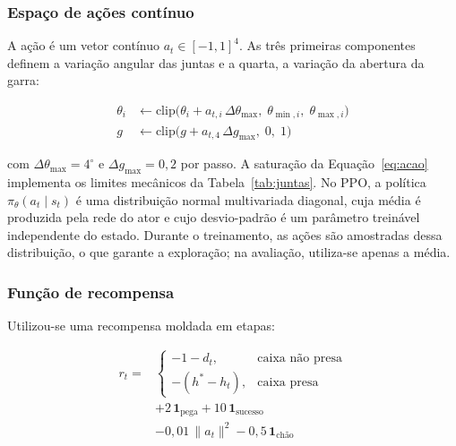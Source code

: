 \documentclass[conference]{IEEEtran}
\begin{document}
\subsubsection{Espaço de ações contínuo}

A ação é um vetor contínuo $a_t \in [-1, 1]^4$. As três primeiras componentes definem a variação angular das juntas e a quarta, a variação da abertura da garra:

\begin{equation}
    \begin{aligned}
        \theta_i &\leftarrow \text{clip}\big(\theta_i + a_{t,i}\,\Delta\theta_{\max},\; \theta_{\min,i},\; \theta_{\max,i}\big) \\
        g &\leftarrow \text{clip}\big(g + a_{t,4}\,\Delta g_{\max},\; 0,\; 1\big)
    \end{aligned}
    \label{eq:acao}
\end{equation}

\noindent com $\Delta\theta_{\max} = 4^\circ$ e $\Delta g_{\max} = 0{,}2$ por passo. A saturação da Equação~\eqref{eq:acao} implementa os limites mecânicos da Tabela~\ref{tab:juntas}. No PPO, a política $\pi_\theta(a_t \mid s_t)$ é uma distribuição normal multivariada diagonal, cuja média é produzida pela rede do ator e cujo desvio-padrão é um parâmetro treinável independente do estado. Durante o treinamento, as ações são amostradas dessa distribuição, o que garante a exploração; na avaliação, utiliza-se apenas a média.

\subsubsection{Função de recompensa}

Utilizou-se uma recompensa moldada em etapas:

\begin{equation}
    \begin{aligned}
        r_t ={}& \begin{cases}
            -1 - d_t, & \text{caixa não presa} \\
            -(h^{*} - h_t), & \text{caixa presa}
        \end{cases} \\
        & + 2\,\mathbf{1}_{\text{pega}} + 10\,\mathbf{1}_{\text{sucesso}} \\
        & - 0{,}01\,\lVert a_t \rVert^2 - 0{,}5\,\mathbf{1}_{\text{chão}}
    \end{aligned}
    \label{eq:recompensa}
\end{equation}
\end{document}
